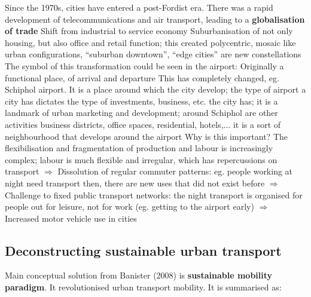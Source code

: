 \documentclass{article}
\begin{document}
\begin{outline}
	\1 Since the 1970s, cities have entered a post-Fordist era. There was a rapid development of telecommunications and air transport, leading to a \textbf{globalisation of trade}
	\1 Shift from industrial to service economy
	\1 Suburbanisation of not only housing, but also office and retail function; this created polycentric, mosaic like urban configurations, ``suburban downtown'', ``edge cities'' are new constellations
	\1 The symbol of this transformation could be seen in the airport:
		\2 Originally a functional place, of arrival and departure
		\2 This has completely changed, eg. Schiphol airport. It is a place around which the city develop; the type of airport a city has dictates the type of investments, business, etc. the city has; it is a landmark of urban marketing and development; around Schiphol are other activities business districts, office spaces, residential, hotels,... it is a sort of neighbourhood that develops around the airport
	\1 Why is this important? The flexibilisation and fragmentation of production and labour is increasingly complex; labour is much flexible and irregular, which has repercussions on transport 
	\1 $\Rightarrow$ Dissolution of regular commuter patterns: eg. people working at night need transport then, there are new uses that did not exist before
	\1 $\Rightarrow$ Challenge to fixed public transport networks: the night transport is organised for people out for leisure, not for work (eg. getting to the airport early)
	\1 $\Rightarrow$ Increased motor vehicle use in cities
\end{outline}

\subsection{Deconstructing sustainable urban transport}

Main conceptual solution from Banister (2008) is \textbf{sustainable mobility paradigm}. It revolutionised urban transport mobility.
It is summarised as:
\end{document}
